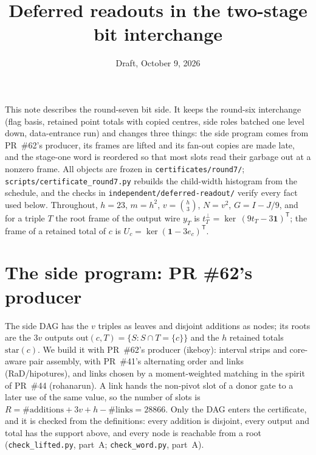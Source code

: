 \documentclass[11pt]{article}
\title{Deferred readouts in the two-stage bit interchange}
\date{Draft, October 9, 2026}
\theoremstyle{remark}\newtheorem*{remark}{Remark}
\begin{document}
\maketitle

This note describes the round-seven bit side. It keeps the round-six interchange (flag basis, retained point totals
with copied centres, side roles batched one level down, data-entrance run) and changes three things: the side
program comes from PR~\#62's producer, its frames are lifted and its fan-out copies are made late, and the stage-one
word is reordered so that most slots read their garbage out at a nonzero frame. All objects are frozen in
\texttt{certificates/round7/}; \texttt{scripts/certificate\_round7.py} rebuilds the child-width histogram from the
schedule, and the checks in \texttt{independent/deferred-readout/} verify every fact used below. Throughout, $h=23$,
$m=h^2$, $v=\binom h3$, $N=v^2$, $G=I-J/9$, and for a triple $T$ the root frame of the output wire $y_T$ is
$t_T^\perp=\ker\,(9t_T-3\mathbf 1)^{\mathsf T}$; the frame of a retained total of $c$ is $U_c=\ker(\mathbf 1-3e_c)^{\mathsf T}$.

\section{The side program: PR \#62's producer}
The side DAG has the $v$ triples as leaves and disjoint additions as nodes; its roots are the $3v$ outputs
$\mathrm{out}(c,T)=\{S: S\cap T=\{c\}\}$ and the $h$ retained totals $\mathrm{star}(c)$. We build it with PR~\#62's
producer (ikeboy): interval strips and core-aware pair assembly, with PR~\#41's alternating order and links
(RaD/hipotures), and links chosen by a moment-weighted matching in the spirit of PR~\#44 (rohanarun). A link hands the
non-pivot slot of a donor gate to a later use of the same value, so the number of slots is
$R=\#\text{additions}+3v+h-\#\text{links}=28866$. Only the DAG enters the certificate, and it is checked from the
definitions: every addition is disjoint, every output and total has the support above, and every node is reachable
from a root (\texttt{check\_lifted.py}, part~A; \texttt{check\_word.py}, part~A).
\end{document}
